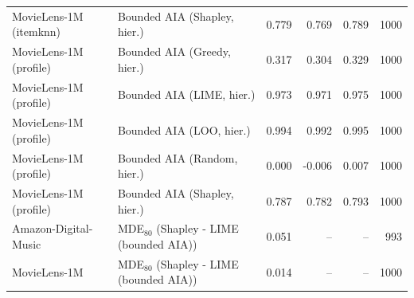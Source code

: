 \begin{table}[t]
\begin{tabular}{@{}llrrrr@{}}
MovieLens-1M (itemknn) & Bounded AIA (Shapley, hier.) & 0.779 & 0.769 & 0.789 & 1000 \\
MovieLens-1M (profile) & Bounded AIA (Greedy, hier.) & 0.317 & 0.304 & 0.329 & 1000 \\
MovieLens-1M (profile) & Bounded AIA (LIME, hier.) & 0.973 & 0.971 & 0.975 & 1000 \\
MovieLens-1M (profile) & Bounded AIA (LOO, hier.) & 0.994 & 0.992 & 0.995 & 1000 \\
MovieLens-1M (profile) & Bounded AIA (Random, hier.) & 0.000 & -0.006 & 0.007 & 1000 \\
MovieLens-1M (profile) & Bounded AIA (Shapley, hier.) & 0.787 & 0.782 & 0.793 & 1000 \\
Amazon-Digital-Music & MDE$_80$ (Shapley - LIME (bounded AIA)) & 0.051 & -- & -- & 993 \\
MovieLens-1M & MDE$_80$ (Shapley - LIME (bounded AIA)) & 0.014 & -- & -- & 1000 \\
\bottomrule
\end{tabular}
\end{table}
